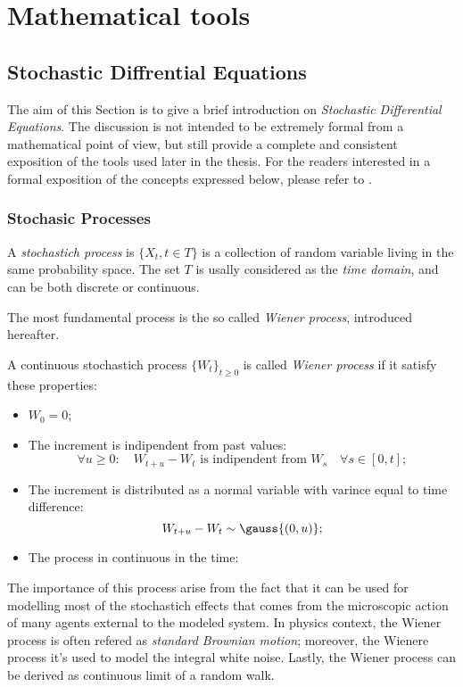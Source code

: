 \chapter{Mathematical tools} \label{app:math_tools}
\section{Stochastic Diffrential Equations}
The aim of this Section is to give a brief introduction on \emph{Stochastic Differential Equations}.
The discussion is not intended to be extremely formal from a mathematical point of view,
but still provide a complete and consistent exposition of the tools used later in the thesis.
For the readers interested in a formal exposition of the concepts expressed below, please refer to \cite{morters2010brownian}.

\subsection{Stochasic Processes}
\begin{Definition}
  A \emph{stochastich process} is \(\{X_t, t\in T\}\) is a collection of random variable living in the same probability space.
  The set \(T\) is usally considered as the \emph{time domain}, and can be both discrete or continuous.
\end{Definition}

The most fundamental process is the so called \emph{Wiener process}, introduced hereafter.
\begin{Definition}
  A continuous stochastich process \(\{W_t\}_{t\ge0}\) is called \emph{Wiener process} if it satisfy these properties:
  \begin{itemize}
    \item \(W_0 = 0\);
    \item The increment is indipendent from past values:
          \[\forall u\ge0: \quad W_{t+u} - W_t  \text{ is indipendent from } W_s \quad \forall s\in[0,t];\]
    \item The increment is distributed as a normal variable with varince equal to time difference:
          \[W_{t+u}-W_t \sim \gauss{(0,u)};\]
    \item The process in continuous in the time:
          \[\] %
  \end{itemize}
\end{Definition}
The importance of this process arise from the fact that it can be used for modelling
most of the stochastich effects that comes from the microscopic action of many agents
external to the modeled system.
In physics context, the Wiener process is often refered as \emph{standard Brownian motion};
moreover, the Wienere process it's used to model the integral white noise.
Lastly, the Wiener process can be derived as continuous limit of a random walk.

